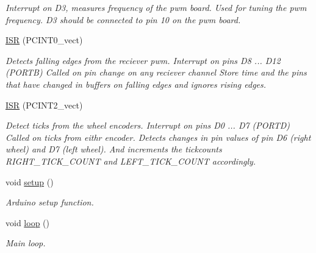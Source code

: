\begin{DoxyCompactItemize}
\begin{DoxyCompactList}\small\item\em Interrupt on D3, measures frequency of the pwm board. Used for tuning the pwm frequency. D3 should be connected to pin 10 on the pwm board. \end{DoxyCompactList}\item 
\hyperlink{svea__arduino__src_8ino_aa64c6dce15e9de9105b4ae9533c9a267}{I\+SR} (P\+C\+I\+N\+T0\+\_\+vect)\hypertarget{svea__arduino__src_8ino_aa64c6dce15e9de9105b4ae9533c9a267}{}\label{svea__arduino__src_8ino_aa64c6dce15e9de9105b4ae9533c9a267}

\begin{DoxyCompactList}\small\item\em Detects falling edges from the reciever pwm. Interrupt on pins D8 ... D12 (P\+O\+R\+TB) Called on pin change on any reciever channel Store time and the pins that have changed in buffers on falling edges and ignores rising edges. \end{DoxyCompactList}\item 
\hyperlink{svea__arduino__src_8ino_a9c4665742c6b6eb1f0bb9dde41f7cba3}{I\+SR} (P\+C\+I\+N\+T2\+\_\+vect)\hypertarget{svea__arduino__src_8ino_a9c4665742c6b6eb1f0bb9dde41f7cba3}{}\label{svea__arduino__src_8ino_a9c4665742c6b6eb1f0bb9dde41f7cba3}

\begin{DoxyCompactList}\small\item\em Detect ticks from the wheel encoders. Interrupt on pins D0 ... D7 (P\+O\+R\+TD) Called on ticks from eithr encoder. Detects changes in pin values of pin D6 (right wheel) and D7 (left wheel). And increments the tickcounts R\+I\+G\+H\+T\+\_\+\+T\+I\+C\+K\+\_\+\+C\+O\+U\+NT and L\+E\+F\+T\+\_\+\+T\+I\+C\+K\+\_\+\+C\+O\+U\+NT accordingly. \end{DoxyCompactList}\item 
void \hyperlink{svea__arduino__src_8ino_a4fc01d736fe50cf5b977f755b675f11d}{setup} ()\hypertarget{svea__arduino__src_8ino_a4fc01d736fe50cf5b977f755b675f11d}{}\label{svea__arduino__src_8ino_a4fc01d736fe50cf5b977f755b675f11d}

\begin{DoxyCompactList}\small\item\em Arduino setup function. \end{DoxyCompactList}\item 
void \hyperlink{svea__arduino__src_8ino_afe461d27b9c48d5921c00d521181f12f}{loop} ()\hypertarget{svea__arduino__src_8ino_afe461d27b9c48d5921c00d521181f12f}{}\label{svea__arduino__src_8ino_afe461d27b9c48d5921c00d521181f12f}

\begin{DoxyCompactList}\small\item\em Main loop. \end{DoxyCompactList}\end{DoxyCompactItemize}


